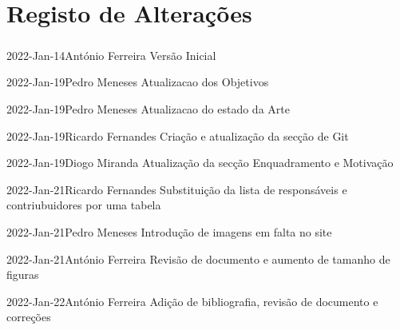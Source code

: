 \chapter*{Registo de Alterações}
\paragraph{}

\begin{logentry}{2022-Jan-14}{António Ferreira}
Versão Inicial
\end{logentry}

\begin{logentry}{2022-Jan-19}{Pedro Meneses}
Atualizacao dos Objetivos
\end{logentry}

\begin{logentry}{2022-Jan-19}{Pedro Meneses}
Atualizacao do estado da Arte
\end{logentry}

\begin{logentry}{2022-Jan-19}{Ricardo Fernandes}
Criação e atualização da secção de Git
\end{logentry}

\begin{logentry}{2022-Jan-19}{Diogo Miranda}
Atualização da secção Enquadramento e Motivação
\end{logentry}

\begin{logentry}{2022-Jan-21}{Ricardo Fernandes}
Substituição da lista de responsáveis e contriubuidores por uma tabela
\end{logentry}

\begin{logentry}{2022-Jan-21}{Pedro Meneses}
Introdução de imagens em falta no site
\end{logentry}

\begin{logentry}{2022-Jan-21}{António Ferreira}
Revisão de documento e aumento de tamanho de figuras
\end{logentry}

\begin{logentry}{2022-Jan-22}{António Ferreira}
Adição de bibliografia, revisão de documento e correções
\end{logentry}